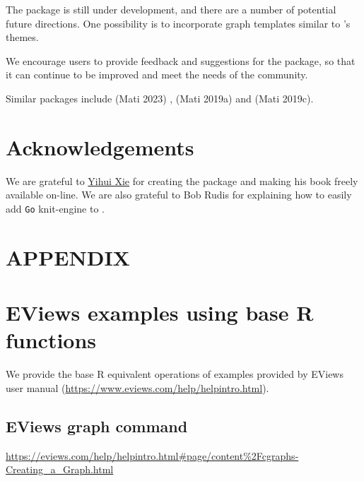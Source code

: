 The  package is still under development, and there are a number of potential future directions. One possibility is to incorporate graph templates similar to 's themes.

We encourage users to provide feedback and suggestions for the  package, so that it can continue to be improved and meet the needs of the community.

Similar packages include  (Mati 2023) ,  (Mati 2019a) and  (Mati 2019c).

\hypertarget{acknowledgements}{%
\section*{Acknowledgements}\label{acknowledgements}}

We are grateful to \href{https://yihui.name/}{Yihui Xie} for creating the  package and making his book freely available on-line. We are also grateful to Bob Rudis for explaining how to easily add \texttt{Go} knit-engine to .


\clearpage

\appendix

\hypertarget{appendix}{%
\section*{APPENDIX}\label{appendix}}

\hypertarget{eviews-examples-using-base-r-functions}{%
\section{EViews examples using base R functions}\label{eviews-examples-using-base-r-functions}}

We provide the base R equivalent operations of examples provided by EViews user manual (\url{https://www.eviews.com/help/helpintro.html}).

\hypertarget{eviews-graph-command}{%
\subsection{EViews graph command}\label{eviews-graph-command}}

\url{https://eviews.com/help/helpintro.html\#page/content\%2Fcgraphs-Creating_a_Graph.html}

